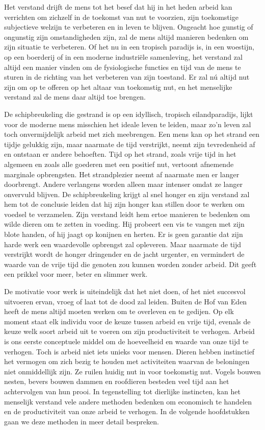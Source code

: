 Het verstand drijft de mens tot het besef dat hij in het heden arbeid
kan verrichten om zichzelf in de toekomst van nut te voorzien, zijn
toekomstige subjectieve welzijn te verbeteren en in leven te blijven.
Ongeacht hoe gunstig of ongunstig zijn omstandigheden zijn, zal de mens
altijd manieren bedenken om zijn situatie te verbeteren. Of het nu in
een tropisch paradijs is, in een woestijn, op een boerderij of in een
moderne industriële samenleving, het verstand zal altijd een manier
vinden om de fysiologische functies en tijd van de mens te sturen in de
richting van het verbeteren van zijn toestand. Er zal nú altijd nut zijn
om op te offeren op het altaar van toekomstig nut, en het menselijke
verstand zal de mens daar altijd toe brengen.

De schipbreukeling die gestrand is op een idyllisch, tropisch
eilandparadijs, lijkt voor de moderne mens misschien het ideale leven te
leiden, maar zo'n leven zal toch onvermijdelijk arbeid
met zich meebrengen. Een mens kan op het strand een tijdje gelukkig
zijn, maar naarmate de tijd verstrijkt, neemt zijn tevredenheid af en
ontstaan er andere behoeften. Tijd op het strand, zoals vrije tijd in
het algemeen en zoals alle goederen met een positief nut, vertoont
afnemende marginale opbrengsten. Het strandplezier neemt af naarmate men
er langer doorbrengt. Andere verlangens worden alleen maar intenser
omdat ze langer onvervuld blijven. De schipbreukeling krijgt al snel
honger en zijn verstand zal hem tot de conclusie leiden dat hij zijn
honger kan stillen door te werken om voedsel te verzamelen. Zijn
verstand leidt hem ertoe manieren te bedenken om wilde dieren om te
zetten in voeding. Hij probeert een vis te vangen met zijn blote handen,
of hij jaagt op konijnen en herten. Er is geen garantie dat zijn harde
werk een waardevolle opbrengst zal opleveren. Maar naarmate de tijd
verstrijkt wordt de honger dringender en de jacht urgenter, en
vermindert de waarde van de vrije tijd die genoten zou kunnen worden
zonder arbeid. Dit geeft een prikkel voor meer, beter en slimmer werk.

De motivatie voor werk is uiteindelijk dat het niet doen, of het niet
succesvol uitvoeren ervan, vroeg of laat tot de dood zal leiden. Buiten
de Hof van Eden heeft de mens altijd moeten werken om te overleven en te
gedijen. Op elk moment staat elk individu voor de keuze tussen arbeid en
vrije tijd, evenals de keuze welk soort arbeid uit te voeren om zijn
productiviteit te verhogen. Arbeid is ons eerste conceptuele middel om
de hoeveelheid en waarde van onze tijd te verhogen. Toch is arbeid niet
iets unieks voor mensen. Dieren hebben instinctief het vermogen om zich
bezig te houden met activiteiten waarvan de beloningen niet onmiddellijk
zijn. Ze ruilen huidig nut in voor toekomstig nut. Vogels bouwen nesten,
bevers bouwen dammen en roofdieren besteden veel tijd aan het
achtervolgen van hun prooi. In tegenstelling tot dierlijke instincten,
kan het menselijk verstand vele andere methoden bedenken om economisch
te handelen en de productiviteit van onze arbeid te verhogen. In de
volgende hoofdstukken gaan we deze methoden in meer detail bespreken.

